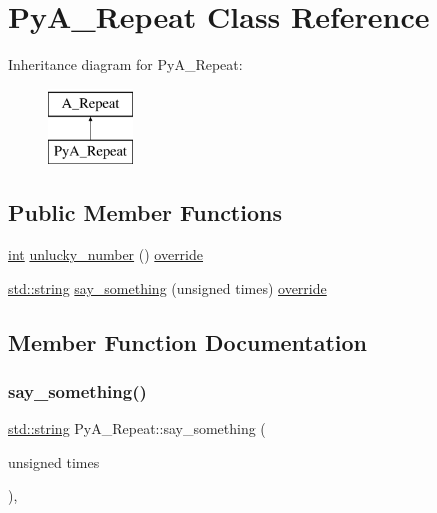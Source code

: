 \hypertarget{class_py_a___repeat}{}\section{Py\+A\+\_\+\+Repeat Class Reference}
\label{class_py_a___repeat}
Inheritance diagram for Py\+A\+\_\+\+Repeat\+:\begin{figure}[H]
\begin{center}
\leavevmode
\includegraphics[height=2.000000cm]{class_py_a___repeat}
\end{center}
\end{figure}
\subsection*{Public Member Functions}
\begin{DoxyCompactItemize}
\item 
\mbox{\hyperlink{warnings_8h_a74f207b5aa4ba51c3a2ad59b219a423b}{int}} \mbox{\hyperlink{class_py_a___repeat_ab5d023f398b7042b61f372d1df259b51}{unlucky\+\_\+number}} () \mbox{\hyperlink{dictobject_8h_a055cf4fd16bde9bce026127362cee1a3}{override}}
\item 
\mbox{\hyperlink{_s_d_l__opengl__glext_8h_ab4ccfaa8ab0e1afaae94dc96ef52dde1}{std\+::string}} \mbox{\hyperlink{class_py_a___repeat_a66d9f3e933653912e59353d5d2abda49}{say\+\_\+something}} (unsigned times) \mbox{\hyperlink{dictobject_8h_a055cf4fd16bde9bce026127362cee1a3}{override}}
\end{DoxyCompactItemize}


\subsection{Member Function Documentation}
\mbox{\label{class_py_a___repeat_a66d9f3e933653912e59353d5d2abda49}} 
\subsubsection{\texorpdfstring{say\_something()}{say\_something()}}
{\footnotesize\ttfamily \mbox{\hyperlink{_s_d_l__opengl__glext_8h_ab4ccfaa8ab0e1afaae94dc96ef52dde1}{std\+::string}} Py\+A\+\_\+\+Repeat\+::say\+\_\+something (\begin{DoxyParamCaption}\item[{unsigned}]{times }\end{DoxyParamCaption})\hspace{0.3cm}{\ttfamily [inline]}, {\ttfamily [override]}}

